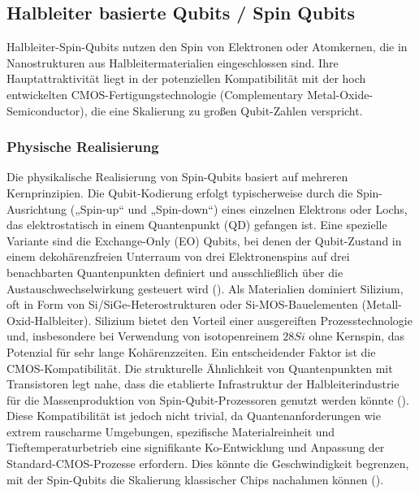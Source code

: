 \subsection{Halbleiter basierte Qubits / Spin Qubits}
Halbleiter-Spin-Qubits nutzen den Spin von Elektronen oder Atomkernen, die in Nanostrukturen aus Halbleitermaterialien eingeschlossen sind. Ihre Hauptattraktivität liegt in der potenziellen Kompatibilität mit der hoch entwickelten CMOS-Fertigungstechnologie (Complementary Metal-Oxide-Semiconductor), die eine Skalierung zu großen Qubit-Zahlen verspricht.

\subsubsection{Physische Realisierung}
Die physikalische Realisierung von Spin-Qubits basiert auf mehreren Kernprinzipien. Die Qubit-Kodierung erfolgt typischerweise durch die Spin-Ausrichtung („Spin-up“ und „Spin-down“) eines einzelnen Elektrons oder Lochs, das elektrostatisch in einem Quantenpunkt (QD) gefangen ist. Eine spezielle Variante sind die Exchange-Only (EO) Qubits, bei denen der Qubit-Zustand in einem dekohärenzfreien Unterraum von drei Elektronenspins auf drei benachbarten Quantenpunkten definiert und ausschließlich über die Austauschwechselwirkung gesteuert wird (\cite{chadwickShortTwoqubitPulse2025}). Als
Materialien dominiert Silizium, oft in Form von Si/SiGe-Heterostrukturen oder Si-MOS-Bauelementen (Metall-Oxid-Halbleiter). Silizium bietet den Vorteil einer ausgereiften Prozesstechnologie und, insbesondere bei Verwendung von isotopenreinem $28Si$ ohne Kernspin, das Potenzial für sehr lange Kohärenzzeiten. Ein entscheidender Faktor ist die
CMOS-Kompatibilität. Die strukturelle Ähnlichkeit von Quantenpunkten mit Transistoren legt nahe, dass die etablierte Infrastruktur der Halbleiterindustrie für die Massenproduktion von Spin-Qubit-Prozessoren genutzt werden könnte (\cite{stuyckCMOSCompatibilitySemiconductor2024}). Diese Kompatibilität ist jedoch nicht trivial, da Quantenanforderungen wie extrem rauscharme Umgebungen, spezifische Materialreinheit und Tieftemperaturbetrieb eine signifikante Ko-Entwicklung und Anpassung der Standard-CMOS-Prozesse erfordern. Dies könnte die Geschwindigkeit begrenzen, mit der Spin-Qubits die Skalierung klassischer Chips nachahmen können (\cite{chadwickShortTwoqubitPulse2025}).

